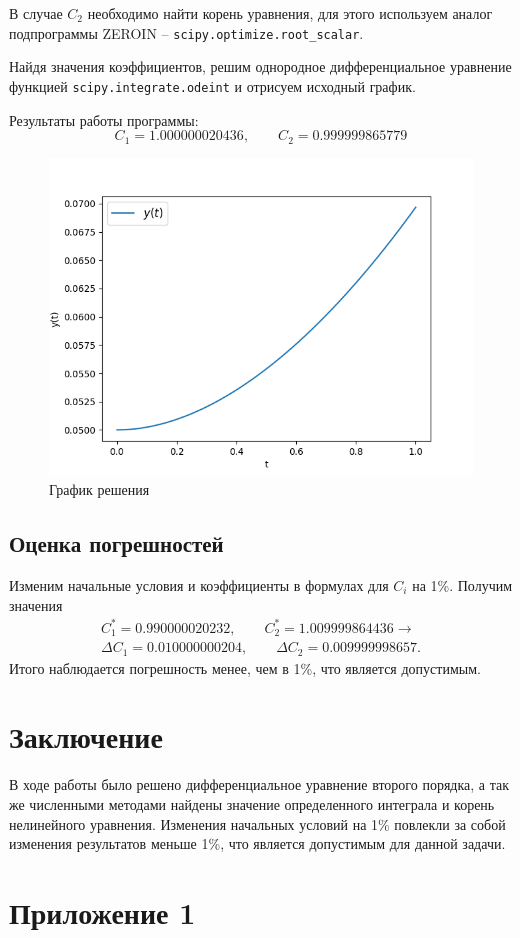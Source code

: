 \documentclass[a4paper,12pt]{article}
\begin{document}
	В случае $C_2$ необходимо найти корень уравнения, для этого используем аналог подпрограммы
	ZEROIN -- \texttt{scipy.optimize.root\_scalar}.

	Найдя значения коэффициентов, решим однородное дифференциальное уравнение функцией \texttt{scipy.integrate.odeint}
	и отрисуем исходный график.

	Результаты работы программы:
	\begin{equation*}
		C_1 = 1.000000020436, \qquad C_2 = 0.999999865779
	\end{equation*}

	\begin{figure}[H]
		\centering
		\includegraphics[width=0.8\linewidth]{polytech/calc-math/coursework/subfiles/images/graph}
		\caption{График решения}
		\label{fig:graph}
	\end{figure}

	\subsection{Оценка погрешностей}
	Изменим начальные условия и коэффициенты в формулах для $C_i$ на 1\%. Получим значения
	\begin{gather*}
		C_1^* = 0.990000020232, \qquad C_2^* = 1.009999864436 \rightarrow \\
		\Delta C_1 = 0.010000000204, \qquad \Delta C_2 = 0.009999998657.
	\end{gather*}
	Итого наблюдается погрешность менее, чем в 1\%, что является допустимым.

	\section{Заключение}
	В ходе работы было решено дифференциальное уравнение второго порядка, а так же
	численными методами найдены значение определенного интеграла и корень нелинейного
	уравнения. Изменения начальных условий на 1\% повлекли за собой изменения результатов
	меньше 1\%, что является допустимым для данной задачи.

	\newpage
	\section{Приложение 1}
	
\end{document}
